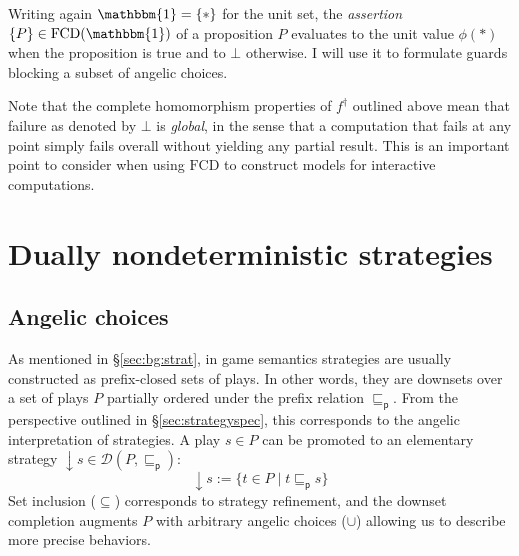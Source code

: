 \documentclass[11pt,oneside]{book}
\theoremstyle{definition}
\newcommand{\kw}[1]{\ensuremath{ \mathsf{#1} }}
\newcommand{\pref}{\sqsubseteq_\kw{p}}  %
\begin{document}
Writing again $\mathbbm{1} = \{ * \}$ for the unit set,
the \emph{assertion} $\{P\} \in \mathrm{FCD}(\mathbbm{1})$ of a proposition $P$
evaluates to the unit value $\phi(*)$ when the proposition is true
and to $\bot$ otherwise.
I will use it to formulate guards
blocking a subset of angelic choices.

Note that the complete homomorphism properties of $f^\dagger$
outlined above
mean that failure as denoted by $\bot$ is \emph{global},
in the sense that a computation that fails at any point
simply fails overall without yielding any partial result.
This is an important point to consider when using $\mathrm{FCD}$
to construct models for interactive computations.


\section{Dually nondeterministic strategies} \label{sec:dnds} %

\subsection{Angelic choices} %

As mentioned in \S\ref{sec:bg:strat},
in game semantics strategies are usually constructed as
prefix-closed sets of plays.
In other words,
they are downsets over a set of plays $P$
partially ordered under the prefix relation $\pref$.
From the perspective outlined in \S\ref{sec:strategyspec},
this corresponds to the angelic interpretation
of strategies.
A play $s \in P$ can be promoted to an elementary strategy
${\downarrow} s \in \mathcal{D}(P, {\pref})$:
\[
    {\downarrow} s := \{ t \in P \mid t \pref s \}
\]
Set inclusion ($\subseteq$) corresponds to strategy refinement,
and the downset completion augments $P$ with
arbitrary angelic choices ($\cup$)
allowing us to describe more precise behaviors.
\end{document}
